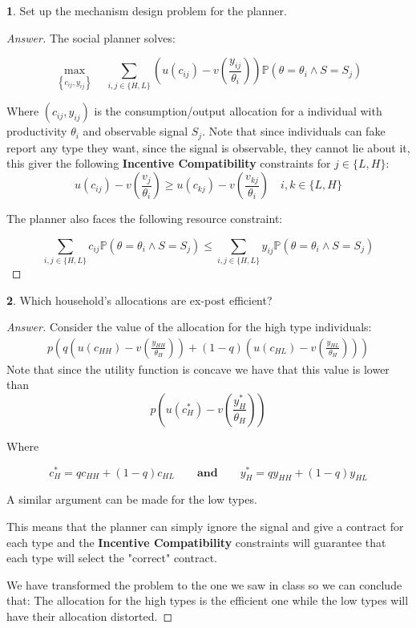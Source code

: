 \documentclass[12pt]{article}
\theoremstyle{definition}
\newtheorem{subproblem}{}[problem]
\newcommand{\qaq}{\qquad \textbf{and} \qquad}
\begin{document}
\begin{subproblem}
 Set up the mechanism design problem for the planner.
\end{subproblem}

\begin{proof}[Answer]
The social planner solves:

\begin{equation}\label{planprob}
    \max_{\left\{c_{ij}, y_{ij}\right\}} \quad \sum_{i,j\in\{H,L\}}  \left(u(c_{ij}) - v\left(\frac{y_{ij}}{\theta_i} \right) \right)\mathbb{P}(\theta = \theta_i \land S = S_j)
\end{equation}

Where $(c_{ij}, y_{ij})$ is the consumption/output allocation for a individual with productivity $\theta_i$ and observable signal $S_j$. Note that since individuals can fake report any type they want, since the signal is observable, they cannot lie about it, this giver the following \textbf{Incentive Compatibility} constraints for $j\in \{L,H\}$:
$$u(c_{ij}) - v\left(\frac{v_{j}}{\theta_i} \right) \geq u(c_{kj}) - v\left(\frac{v_{kj}}{\theta_i} \right)\quad i,k\in \{L,H\}$$

The planner also faces the following resource constraint: 

$$ \sum_{i,j\in\{H,L\}} c_{ij} \mathbb{P}(\theta = \theta_i \land S = S_j)  \leq \sum_{i,j\in\{H,L\}} y_{ij} \mathbb{P}(\theta = \theta_i \land S = S_j) $$

\end{proof}

\begin{subproblem}
 Which household's allocations are ex-post efficient?
\end{subproblem}

\begin{proof}[Answer]

Consider the value of the allocation for the  high type individuals:
\begin{align*}
p\left( q\left(u(c_{HH}) - v\left( \frac{y_{HH}}{\theta_H} \right)\right) +  (1-q)\left(u(c_{HL}) - v\left( \frac{y_{HL}}{\theta_H} \right)\right)\right)
\end{align*}
Note that since the utility function is concave we have that this value is lower than $$p\left(u(c_H^*) - v\left( \frac{y_H^*}{\theta_H} \right)\right)$$

Where

$$ c_H^* = q c_{HH} + (1-q)c_{HL} \qaq y_H^* = q y_{HH} + (1-q)y_{HL} $$

A similar argument can be made for the low types.

This means that the planner can simply ignore the signal and give a contract for each type and the \textbf{Incentive Compatibility} constraints will guarantee that each type will select the "correct" contract.

We have transformed the problem to the one we saw in class so we can conclude that: The allocation for the high types is the efficient one while the low types will have their allocation distorted.

\end{proof}
\end{document}
